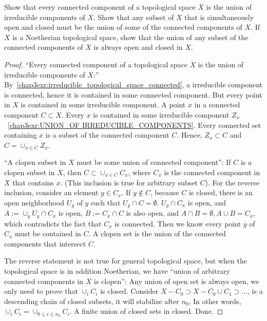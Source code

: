 \begin{exr}\label{chap3exr:topology_irreducible_components_connected_components}
Show that every connected component of a topological space $X$ is the union of irreducible components of $X$. Show that any subset of $X$ that is simultaneously open and closed must be the union of some of the connected components of $X$. If $X$ is a Noetherian topological space, show that the union of any subset of the connected components of $X$ is always open and closed in $X$.
\end{exr}
\begin{proof}
``Every connected component of a topological space $X$ is the union of irreducible components of $X$:'' By~\ref{chap3exr:irreducible_topological_space_connected}, a irreducible component is connected, hence it is contained in some connected component. But every point in $X$ is contained in some irreducible component. A point $x$ in a connected component $C\subset X$. Every $x$ is contained in some irreducible component $Z_x$~\ref{chap3exr:UNION_OF IRREDUCIBLE_COMPONENTS}. Every connected set containing $x$ is a subset of the connected component $C$. Hence, $Z_x\subset C$ and $C=\cup_{x\in C} Z_x$.

``A clopen subset in $X$ must be some union of connected component'': If $C$ is a clopen subset in $X$, then $C\subset \cup_{x\in C}C_x$, where $C_x$ is the connected component in $X$ that contains $x$. (This inclusion is true for arbitrary subset $C$). For the reverse inclusion, consider an element $y\in C_x$. If $y\notin C$, because $C$ is closed, there is an open neighborhood $U_y$ of $y$ such that $U_y\cap C=\emptyset$. $U_y\cap C_x$ is open, and $A:=\cup_y U_y\cap C_x$ is open, $B:=C_x\cap C$ is also open, and $A\cap B=\emptyset, A\cup B=C_x$, which contradicts the fact that $C_x$ is connected. Then we know every point $y$ of $C_x$ must be contained in $C$. A clopen set is the union of the connected components that intersect $C$.

The reverse statement is not true for general topological space, but when the topological space is in addition Noetherian, we have ``union of arbitrary connected components in $X$ is clopen'': Any union of open set is always open, we only need to prove that $\cup_i C_i$ is closed. Consider $X-C_0\supset X-C_0\cup C_1\supset...$, is a descending chain of closed subsets, it will stabilize after $n_0$, In other words, $\cup_i C_i=\cup_{0\leq i\leq n_0} C_i$. A finite union of closed sets in closed. Done.

\end{proof}

